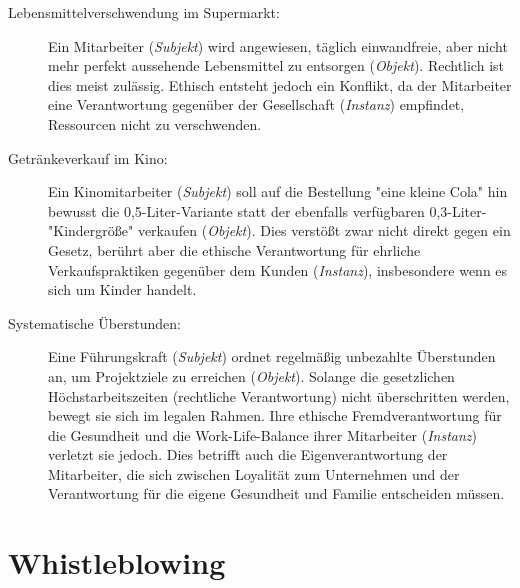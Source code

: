 \documentclass[
    12pt,               %
    a4paper,            %
    ngerman             %
]{scrartcl}
\begin{document}
\begin{description}
    \item[Lebensmittelverschwendung im Supermarkt:] Ein Mitarbeiter (\textit{Subjekt}) wird angewiesen, täglich einwandfreie, aber nicht mehr perfekt aussehende Lebensmittel zu entsorgen (\textit{Objekt}). Rechtlich ist dies meist zulässig. Ethisch entsteht jedoch ein Konflikt, da der Mitarbeiter eine Verantwortung gegenüber der Gesellschaft (\textit{Instanz}) empfindet, Ressourcen nicht zu verschwenden.
    \item[Getränkeverkauf im Kino:] Ein Kinomitarbeiter (\textit{Subjekt}) soll auf die Bestellung "eine kleine Cola" hin bewusst die 0,5-Liter-Variante statt der ebenfalls verfügbaren 0,3-Liter-"Kindergröße" verkaufen (\textit{Objekt}). Dies verstößt zwar nicht direkt gegen ein Gesetz, berührt aber die ethische Verantwortung für ehrliche Verkaufspraktiken gegenüber dem Kunden (\textit{Instanz}), insbesondere wenn es sich um Kinder handelt.
    \item[Systematische Überstunden:] Eine Führungskraft (\textit{Subjekt}) ordnet regelmäßig unbezahlte Überstunden an, um Projektziele zu erreichen (\textit{Objekt}). Solange die gesetzlichen Höchstarbeitszeiten (rechtliche Verantwortung) nicht überschritten werden, bewegt sie sich im legalen Rahmen. Ihre ethische Fremdverantwortung für die Gesundheit und die Work-Life-Balance ihrer Mitarbeiter (\textit{Instanz}) verletzt sie jedoch. Dies betrifft auch die Eigenverantwortung der Mitarbeiter, die sich zwischen Loyalität zum Unternehmen und der Verantwortung für die eigene Gesundheit und Familie entscheiden müssen.
\end{description}


\section{Whistleblowing}
\nocite{ihk-whistleblowing}
\par\noindent %
\end{document}
